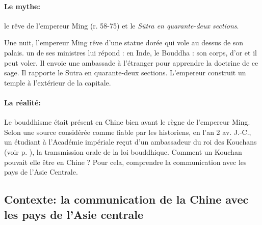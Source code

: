 \paragraph{Le mythe:}

le rêve de l’empereur Ming (r. 58-75) et le \textit{Sūtra en quarante-deux sections}. 
\begin{singlequote}
    Une nuit, l'empereur Ming rêve d'une statue dorée qui vole au dessus de son palais. un de ses ministres lui répond : en Inde, le Bouddha : son corps, d'or et il peut voler.  Il envoie une ambassade à l'étranger pour apprendre la doctrine de ce sage. Il rapporte le Sūtra en quarante-deux sections. L'empereur construit un temple à l'extérieur de la capitale. 
\end{singlequote}

\paragraph{La réalité:}

Le bouddhisme était présent en Chine bien avant le règne de l’empereur Ming.
Selon une source considérée comme fiable par les historiens, en l’an 2 av. J.-C., un étudiant à l’Académie impériale reçut d’un ambassadeur du roi des Kouchans (voir p. \pageref{sec:Kuchan}), la transmission orale de la loi bouddhique.
Comment un Kouchan pouvait elle être en Chine ? Pour cela, comprendre la communication avec les pays de l'Asie Centrale. 

 \subsection{Contexte: la communication de la Chine avec les pays de l’Asie centrale}


